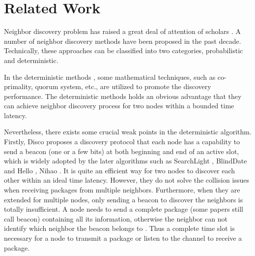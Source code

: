 \section{Related Work}
\label{RW}









Neighbor discovery problem has raised a great deal of attention of scholars \cite{sun2014energy}. 
A number of neighbor discovery methods have been proposed in the past decade.
Technically, these approaches can be classified into two categories, probabilistic and deterministic. 

In the deterministic methods \cite{dutta2008practical,kandhalu2010u,
bakht2012searchlight,sun2014hello,chen2015heterogeneous,
wang2015blinddate,qiu2016talk}, some mathematical techniques, such as
co-primality, quorum system, etc., are utilized to promote the discovery performance.
The deterministic methods holds an obvious advantage that they
can achieve neighbor discovery process for two nodes within a bounded time latency.

Nevertheless, there exists some crucial weak points in the deterministic algorithm.
Firstly, Disco \cite{dutta2008practical} proposes a discovery protocol that
each node has a capability to send a beacon (one or a few bits) at both beginning and end of
an active slot, which is widely adopted by the later algorithms such as
SearchLight \cite{bakht2012searchlight}, BlindDate \cite{wang2015blinddate}
and Hello \cite{sun2014hello}, Nihao \cite{qiu2016talk}. It is quite an efficient way for two nodes to discover
each other within an ideal time latency. However,  they do not solve the collision 
issues when receiving packages from multiple neighbors. Furthermore, when they are 
extended for multiple nodes, only sending a beacon to discover the neighbors is 
totally insufficient. A node needs to send a complete package 
(some papers still call beacon) containing all its information,
otherwise the neighbor can not  identify which neighbor the beacon belongs to \cite{zhou2004impact}.
Thus a complete time slot is necessary for a node to transmit a package or listen to 
the channel to receive a package.

